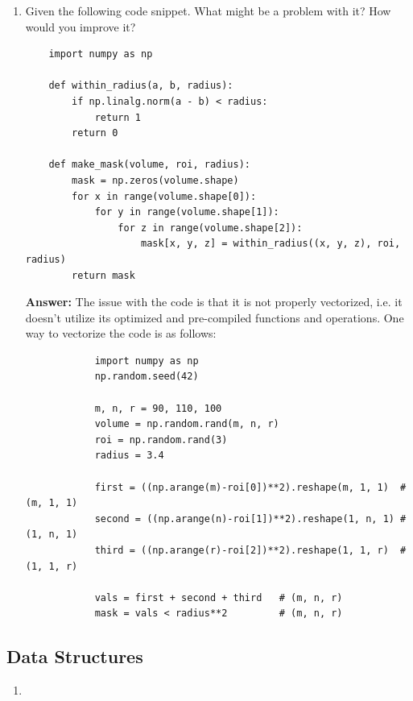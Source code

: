 \documentclass{article}
\newenvironment{QandA}{\begin{enumerate}[label=\arabic*.]}{\end{enumerate}}
\newenvironment{answer}{\par\normalfont \textbf{Answer:}}{}
\begin{document}
\begin{QandA}
\begin{answer}
        (Source: \href{https://hangzhang.org/PyTorch-Encoding/tutorials/syncbn.html}{Hang Zhang's blog})
    \end{answer}

    \item Given the following code snippet. What might be a problem with it? How would you improve it?

    \begin{lstlisting}
    import numpy as np
    
    def within_radius(a, b, radius):
        if np.linalg.norm(a - b) < radius:
            return 1
        return 0
    
    def make_mask(volume, roi, radius):
        mask = np.zeros(volume.shape)
        for x in range(volume.shape[0]):
            for y in range(volume.shape[1]):
                for z in range(volume.shape[2]):
                    mask[x, y, z] = within_radius((x, y, z), roi, radius)
        return mask
    \end{lstlisting}
    
    \begin{answer}
        The issue with the code is that it is not properly vectorized, i.e. it doesn't utilize its optimized and pre-compiled functions and operations. One way to vectorize the code is as follows:
        \begin{lstlisting}
            import numpy as np
            np.random.seed(42)
            
            m, n, r = 90, 110, 100
            volume = np.random.rand(m, n, r)
            roi = np.random.rand(3)
            radius = 3.4
            
            first = ((np.arange(m)-roi[0])**2).reshape(m, 1, 1)  # (m, 1, 1)
            second = ((np.arange(n)-roi[1])**2).reshape(1, n, 1) # (1, n, 1)
            third = ((np.arange(r)-roi[2])**2).reshape(1, 1, r)  # (1, 1, r)
            
            vals = first + second + third   # (m, n, r)
            mask = vals < radius**2         # (m, n, r)
        \end{lstlisting}
        
    \end{answer}
    
\end{QandA}

\subsection{Data Structures}
\begin{QandA}
    \item 
\end{QandA}
\end{document}
